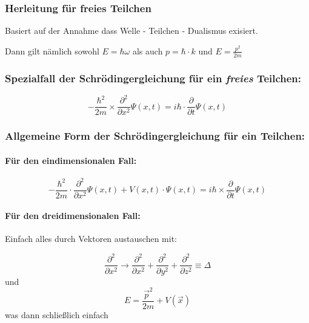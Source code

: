 \subsubsection{Herleitung für freies Teilchen}
Basiert auf der Annahme dass Welle - Teilchen - Dualismus exisiert. 

Dann gilt nämlich sowohl $E = \hbar \omega$ als auch $p = \hbar \cdot k$ und $E = \frac{p^2}{2m}$

\subsubsection{Spezialfall der Schrödingergleichung für ein \textit{freies} Teilchen:}
\begin{equation}
    -\frac{\hbar^2}{2m} \times \frac{\partial^2}{\partial x^2} \Psi(x,t)  = i \hbar \cdot \frac{\partial}{\partial t} \Psi(x,t)
\end{equation}

\subsubsection{Allgemeine Form der Schrödingergleichung für ein Teilchen:}

\paragraph{Für den eindimensionalen Fall:}
\begin{equation}
    -\frac{\hbar^2}{2m} \cdot \frac{\partial^2}{\partial x^2} \Psi(x,t) + V(x,t) \cdot \Psi(x,t) = i \hbar \times \frac{\partial}{\partial t} \Psi(x,t)
\end{equation}

\paragraph{Für den dreidimensionalen Fall:}

Einfach alles durch Vektoren austauschen mit: 

\begin{equation}
    \frac{\partial^2}{\partial x^2} \longrightarrow \frac{\partial^2}{\partial x^2} + \frac{\partial^2}{\partial y^2} + \frac{\partial^2}{\partial z^2} \equiv \Delta
\end{equation}
und 
\begin{equation}
    E = \frac{\vec{p}^2}{2m} + V(\vec{x})
\end{equation}
was dann schließlich einfach

